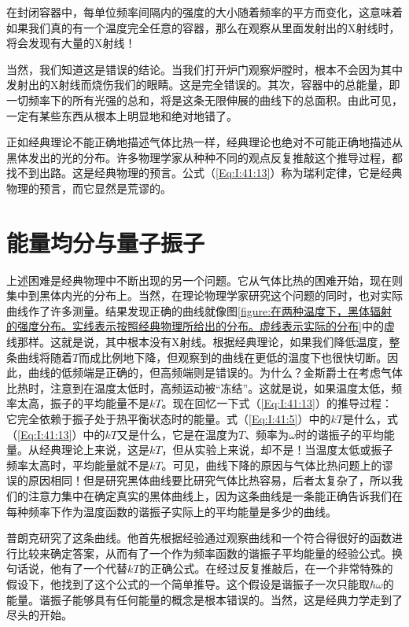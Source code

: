 在封闭容器中，每单位频率间隔内的强度的大小随着频率的平方而变化，这意味着如果我们真的有一个温度完全任意的容器，那么在观察从里面发射出的X射线时，将会发现有大量的X射线！

当然，我们知道这是错误的结论。当我们打开炉门观察炉膛时，根本不会因为其中发射出的X射线而烧伤我们的眼睛。这是完全错误的。其次，容器中的总能量，即一切频率下的所有光强的总和，将是这条无限伸展的曲线下的总面积。由此可见，一定有某些东西从根本上明显地和绝对地错了。

正如经典理论不能正确地描述气体比热一样，经典理论也绝对不可能正确地描述从黑体发出的光的分布。许多物理学家从种种不同的观点反复推敲这个推导过程，都找不到出路。这是经典物理的预言。公式（\ref{Eq:I:41:13}）称为瑞利定律，它是经典物理的预言，而它显然是荒谬的。

\section{能量均分与量子振子}

上述困难是经典物理中不断出现的另一个问题。它从气体比热的困难开始，现在则集中到黑体内光的分布上。当然，在理论物理学家研究这个问题的同时，也对实际曲线作了许多测量。结果发现正确的曲线就像图\ref{figure:在两种温度下，黑体辐射的强度分布。实线表示按照经典物理所给出的分布。虚线表示实际的分布}中的虚线那样。这就是说，其中根本没有X射线。根据经典理论，如果我们降低温度，整条曲线将随着$T$而成比例地下降，但观察到的曲线在更低的温度下也很快切断。因此，曲线的低频端是正确的，但高频端则是错误的。为什么？金斯爵士在考虑气体比热时，注意到在温度太低时，高频运动被“冻结”。这就是说，如果温度太低，频率太高，振子的平均能量不是$kT$。现在回忆一下式（\ref{Eq:I:41:13}）的推导过程：它完全依赖于振子处于热平衡状态时的能量。式（\ref{Eq:I:41:5}）中的$kT$是什么，式（\ref{Eq:I:41:13}）中的$kT$又是什么，它是在温度为$T$、频率为$\omega$时的谐振子的平均能量。从经典理论上来说，这是$kT$，但从实验上来说，却不是！当温度太低或振子频率太高时，平均能量就不是$kT$。可见，曲线下降的原因与气体比热问题上的谬误的原因相同！但是研究黑体曲线要比研究气体比热容易，后者太复杂了，所以我们的注意力集中在确定真实的黑体曲线上，因为这条曲线是一条能正确告诉我们在每种频率下作为温度函数的谐振子实际上的平均能量是多少的曲线。

普朗克研究了这条曲线。他首先根据经验通过观察曲线和一个符合得很好的函数进行比较来确定答案，从而有了一个作为频率函数的谐振子平均能量的经验公式。换句话说，他有了一个代替$kT$的正确公式。在经过反复推敲后，在一个非常特殊的假设下，他找到了这个公式的一个简单推导。这个假设是谐振子一次只能取$\hbar\omega$的能量。谐振子能够具有任何能量的概念是根本错误的。当然，这是经典力学走到了尽头的开始。


